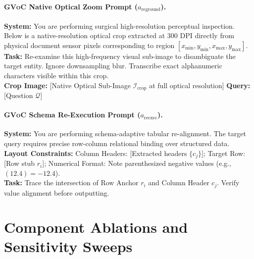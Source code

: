 \documentclass[11pt]{article}
\begin{document}
\paragraph{\textsc{GVoC} Native Optical Zoom Prompt ($a_{\text{reground}}$).}
\begin{tcolorbox}[colback=blue!5,colframe=blue!50,arc=1mm,boxrule=0.5pt]
\small
\textbf{System:} You are performing surgical high-resolution perceptual inspection. Below is a native-resolution optical crop extracted at 300 DPI directly from physical document sensor pixels corresponding to region $[x_{\min}, y_{\min}, x_{\max}, y_{\max}]$. \\
\textbf{Task:} Re-examine this high-frequency visual sub-image to disambiguate the target entity. Ignore downsampling blur. Transcribe exact alphanumeric characters visible within this crop. \\
\textbf{Crop Image:} [Native Optical Sub-Image $\mathcal{I}_{\text{crop}}$ at full optical resolution] \textbf{Query:} [Question $\mathcal{Q}$]
\end{tcolorbox}

\paragraph{\textsc{GVoC} Schema Re-Execution Prompt ($a_{\text{reexec}}$).}
\begin{tcolorbox}[colback=green!5,colframe=green!50,arc=1mm,boxrule=0.5pt]
\small
\textbf{System:} You are performing schema-adaptive tabular re-alignment. The target query requires precise row-column relational binding over structured data. \\
\textbf{Layout Constraints:} Column Headers: [Extracted headers $\{c_j\}$]; Target Row: [Row stub $r_i$]; Numerical Format: Note parenthesized negative values (e.g., $(12.4) = -12.4$). \\
\textbf{Task:} Trace the intersection of Row Anchor $r_i$ and Column Header $c_j$. Verify value alignment before outputting.
\end{tcolorbox}

\section{Component Ablations and Sensitivity Sweeps}
\label{app:ablations}
\end{document}
